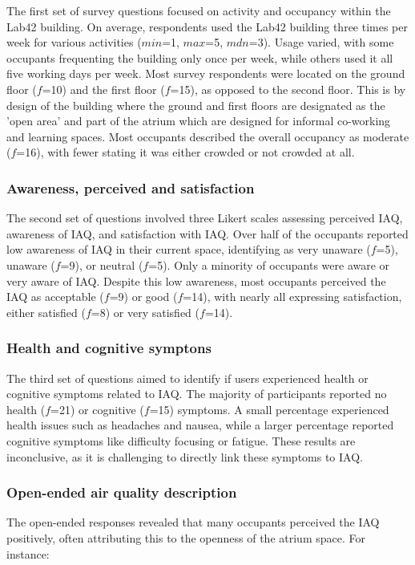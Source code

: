 The first set of survey questions focused on activity and occupancy within the Lab42 building. On average, respondents used the Lab42 building three times per week for various activities ($min$=1, $max$=5, $mdn$=3). Usage varied, with some occupants frequenting the building only once per week, while others used it all five working days per week. Most survey respondents were located on the ground floor ($f$=10) and the first floor ($f$=15), as opposed to the second floor. This is by design of the building where the ground and first floors are designated as the 'open area' and part of the atrium which are designed for informal co-working and learning spaces. Most occupants described the overall occupancy as moderate ($f$=16), with fewer stating it was either crowded or not crowded at all.

\subsubsection{Awareness, perceived and satisfaction}

The second set of questions involved three Likert scales assessing perceived IAQ, awareness of IAQ, and satisfaction with IAQ. Over half of the occupants reported low awareness of IAQ in their current space, identifying as very unaware ($f$=5), unaware ($f$=9), or neutral ($f$=5). Only a minority of occupants were aware or very aware of IAQ. Despite this low awareness, most occupants perceived the IAQ as acceptable ($f$=9) or good ($f$=14), with nearly all expressing satisfaction, either satisfied ($f$=8) or very satisfied ($f$=14).


\subsubsection{Health and cognitive symptons}

The third set of questions aimed to identify if users experienced health or cognitive symptoms related to IAQ. The majority of participants reported no health ($f$=21) or cognitive ($f$=15) symptoms. A small percentage experienced health issues such as headaches and nausea, while a larger percentage reported cognitive symptoms like difficulty focusing or fatigue. These results are inconclusive, as it is challenging to directly link these symptoms to IAQ.

\subsubsection{Open-ended air quality description}
The open-ended responses revealed that many occupants perceived the IAQ positively, often attributing this to the openness of the atrium space. For instance:

